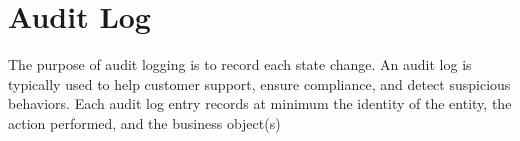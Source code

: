 



\section{Audit Log}\label{sec:adtlog}

The purpose of audit logging is to record each state change. An audit log is typically used to help customer support, ensure compliance, and detect suspicious behaviors. Each audit log entry records at minimum the identity of the entity, the action performed, and the business object(s)~\citep{richardson2018microservices}


